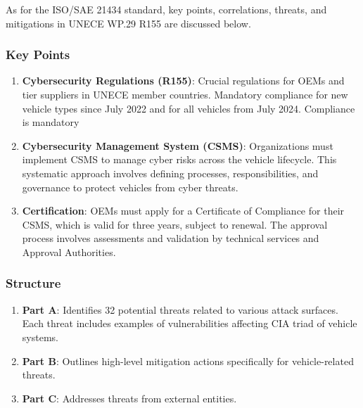 As for the ISO/SAE 21434 standard, key points, correlations, threats, and mitigations in UNECE WP.29 R155 are discussed below.

\subsubsection{Key Points}\label{subsubsec:key-points}
\begin{enumerate}
    \item \textbf{Cybersecurity Regulations (R155)}: Crucial regulations for OEMs and tier suppliers in UNECE member countries.
    Mandatory compliance for new vehicle types since July 2022 and for all vehicles from July 2024.
    Compliance is mandatory
    \item \textbf{Cybersecurity Management System (CSMS)}: Organizations must implement CSMS to manage cyber risks across the vehicle lifecycle.
    This systematic approach involves defining processes, responsibilities, and governance to protect vehicles from cyber threats.
    \item \textbf{Certification}: OEMs must apply for a Certificate of Compliance for their CSMS, which is valid for three years, subject to renewal.
    The approval process involves assessments and validation by technical services and Approval Authorities.
\end{enumerate}


\subsubsection{Structure}\label{subsubsec:structure}
\begin{enumerate}
    \item \textbf{Part A}: Identifies 32 potential threats related to various attack surfaces.
    Each threat includes examples of vulnerabilities affecting CIA triad of vehicle systems.
    \item \textbf{Part B}: Outlines high-level mitigation actions specifically for vehicle-related threats.
    \item \textbf{Part C}: Addresses threats from external entities.
\end{enumerate}

